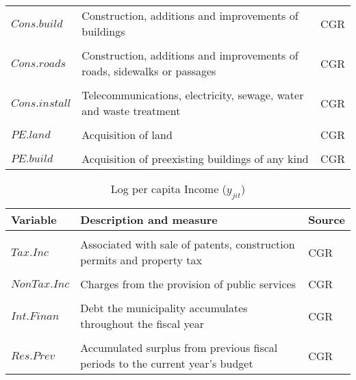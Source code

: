 \begin{table}[ht]
\begin{adjustbox}{max width=\textwidth}
\begin{tabular}{l l l}
$Cons.build$ & Construction, additions and improvements of buildings  & CGR\\
\\
$Cons.roads$ & Construction, additions and improvements of roads,
sidewalks or passages & CGR\\
\\
$Cons.install$ & Telecommunications, electricity, sewage, water and waste treatment & CGR\\
\\
$PE.land$ & Acquisition of land & CGR\\
\\
$PE.build$ & Acquisition of preexisting buildings of any kind & CGR \\
[1ex]
\hline
\end{tabular}
\end{adjustbox}
\label{table:expenditures}
\end{table}

\begin{table}[ht]
\caption{Log per capita Income ($y_{jit}$)}
\centering
\begin{adjustbox}{max width=\textwidth}
\begin{tabular}{l l l}
\hline\hline
Variable & Description and measure & Source \\ [0.5ex] 
\hline
\\
$Tax.Inc$ & Associated with sale of patents, construction permits and property tax & CGR\\
\\
$NonTax.Inc$ & Charges from the provision of public services & CGR\\
\\
$Int.Finan$ & Debt the municipality accumulates throughout the fiscal year & CGR\\
\\
$Res.Prev$ & Accumulated surplus from previous fiscal periods to the current year's budget & CGR\\
[1ex]
\hline
\end{tabular}
\end{adjustbox}
\label{table:income}
\end{table}

